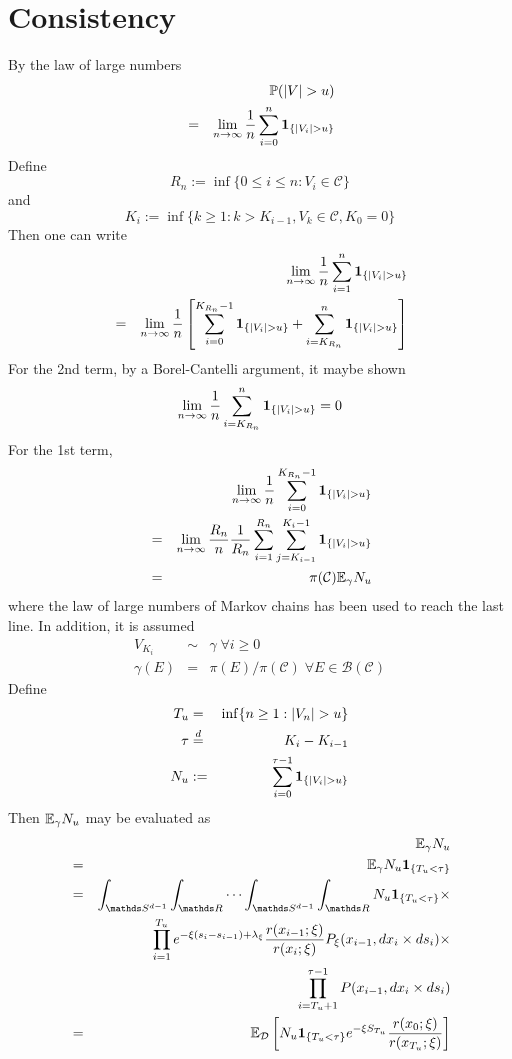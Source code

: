 \documentclass{article}
\begin{document}
\section{Consistency}\label{sec:consistency}
By the law of large numbers
\begin{eqnarray*}
  && \mathbb{P}(|V| > u) \\
  &=& \lim_{n \to \infty} {1 \over n} \sum_{i=0}^n \mathbf{1}_{\{|V_i| > u\}}
\end{eqnarray*}
Define
\[
R_n := \inf\{0 \leq i \leq n: V_i \in \mathcal C\}
\]
and
\[
K_i := \inf\{k \geq 1: k > K_{i-1}, V_k \in \mathcal C, K_0 = 0\}
\]
Then one can write
\begin{eqnarray*}
  && \lim_{n \to \infty} {1 \over n} \sum_{i=1}^n \mathbf{1}_{\{|V_i| > u\}} \\
  &=& \lim_{n \to \infty} {1 \over n} \left[
    \sum_{i=0}^{K_{R_n}-1} \mathbf{1}_{\{|V_i| > u\}} + \sum_{i=K_{R_n}}^n \mathbf{1}_{\{|V_i| > u\}}
\right]
\end{eqnarray*}
For the 2nd term, by a Borel-Cantelli argument, it maybe shown
\[
\lim_{n \to \infty} {1 \over n}\sum_{i=K_{R_n}}^n \mathbf{1}_{\{|V_i| > u\}} = 0
\]
For the 1st term,
\begin{eqnarray*}
&& \lim_{n \to \infty} {1 \over n} \sum_{i=0}^{K_{R_n}-1} \mathbf{1}_{\{|V_i| >
  u\}}  \\
&=& \lim_{n \to \infty} {R_n \over n} {1 \over R_n} \sum_{i=1}^{R_n}
\sum_{j=K_{i-1}}^{K_i-1}\mathbf{1}_{\{|V_i| > u\}} \\
&=& \pi(\mathcal C) \mathbb{E}_\gamma N_u
\end{eqnarray*}
where the law of large numbers of Markov chains has been used to reach
the last line. In addition, it is assumed
\begin{eqnarray*}
  V_{K_i} &\sim& \gamma \; \forall i \geq 0 \\
  \gamma(E) &=& \pi(E)/\pi(\mathcal C)\; \forall E \in \mathcal
  B(\mathcal C)
\end{eqnarray*}
Define
\begin{eqnarray*}
  T_u &=& \inf\{n \geq 1: |V_n| > u\} \\
  \tau &\overset{d}{=}& K_i - K_{i-1} \\
  N_u &:=& \sum_{i=0}^{\tau-1} \mathbf{1}_{\{|V_i| > u\}}  \\
\end{eqnarray*}
Then $\mathbb{E}_\gamma N_u$ may be evaluated as
\begin{eqnarray*}
  && \E_\gamma N_u \\
  &=& \E_\gamma N_u \1{T_u < \tau} \\
  &=& \int_{\mathds S^{d-1}} \int_{\mathds R} \cdots \int_{\mathds
    S^{d-1}} \int_{\mathds R} N_u \1{T_u < \tau} \times \\
  && \prod_{i=1}^{T_u} e^{-\xi(s_i - s_{i-1}) + \lambda_{\xi}}
  {r(x_{i-1}; \xi) \over r(x_{i}; \xi)}P_\xi(x_{i-1}, dx_i \times ds_i) \times \\
  && \prod_{i=T_u+1}^{\tau-1} P(x_{i-1}, dx_i \times d s_i) \\
  &=& \E_{\mathcal D} \left[
    N_u \1{T_u < \tau} e^{-\xi S_{T_u}} {r(x_0; \xi)
      \over r(x_{T_u}; \xi)}
  \right]
\end{eqnarray*}
\end{document}

